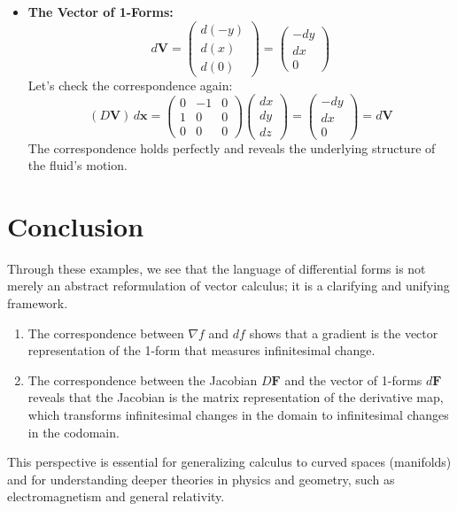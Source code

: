 \documentclass[12pt, letterpaper]{article}
\theoremstyle{definition}
\begin{document}
\begin{itemize}
		\item \textbf{The Vector of 1-Forms:}
		\begin{equation*}
			d\mathbf{V} = \begin{pmatrix} d(-y) \\ d(x) \\ d(0) \end{pmatrix} = \begin{pmatrix} -dy \\ dx \\ 0 \end{pmatrix}
		\end{equation*}
		Let's check the correspondence again:
		\begin{equation*}
			(D\mathbf{V}) \, d\mathbf{x} = \begin{pmatrix} 0 & -1 & 0 \\ 1 & 0 & 0 \\ 0 & 0 & 0 \end{pmatrix} \begin{pmatrix} dx \\ dy \\ dz \end{pmatrix} = \begin{pmatrix} -dy \\ dx \\ 0 \end{pmatrix} = d\mathbf{V}
		\end{equation*}
		The correspondence holds perfectly and reveals the underlying structure of the fluid's motion.
	\end{itemize}
	
	\section{Conclusion}
	Through these examples, we see that the language of differential forms is not merely an abstract reformulation of vector calculus; it is a clarifying and unifying framework.
	\begin{enumerate}
		\item The correspondence between $\nabla f$ and $df$ shows that a gradient is the vector representation of the 1-form that measures infinitesimal change.
		\item The correspondence between the Jacobian $D\mathbf{F}$ and the vector of 1-forms $d\mathbf{F}$ reveals that the Jacobian is the matrix representation of the derivative map, which transforms infinitesimal changes in the domain to infinitesimal changes in the codomain.
	\end{enumerate}
	This perspective is essential for generalizing calculus to curved spaces (manifolds) and for understanding deeper theories in physics and geometry, such as electromagnetism and general relativity.
	
\end{document}
